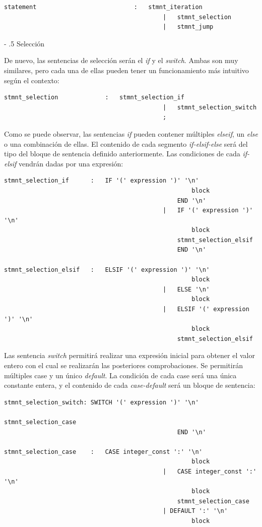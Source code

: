 \documentclass[a4paper,10pt]{article}
\makeatletter
\renewcommand\paragraph{%
   \@startsection{paragraph}{4}{0mm}%
      {-\baselineskip}%
      {.5\baselineskip}%
      {\normalfont\normalsize\bfseries}}
\makeatother
\begin{document}
\begin{lstlisting}
statement							:	stmnt_iteration
											|	stmnt_selection
											|	stmnt_jump
\end{lstlisting}
\paragraph{Selección}

De nuevo, las sentencias de selección serán el \textit{if} y el \textit{switch}. Ambas son muy similares, pero cada una de ellas pueden tener un funcionamiento más intuitivo según el contexto:
\begin{lstlisting}
stmnt_selection				:	stmnt_selection_if
											|	stmnt_selection_switch
											;
\end{lstlisting}

Como se puede observar, las sentencias \textit{if} pueden contener múltiples \textit{elseif}, un \textit{else} o una combinación de ellas. El contenido de cada segmento \textit{if-elsif-else} será del tipo del bloque de sentencia definido anteriormente. Las condiciones de cada \textit{if-elsif} vendrán dadas por una expresión:

\begin{lstlisting}
stmnt_selection_if		:	IF '(' expression ')' '\n' 
													block 
												END '\n'
											|	IF '(' expression ')' '\n' 
													block 
												stmnt_selection_elsif 
												END '\n'
									
stmnt_selection_elsif	:	ELSIF '(' expression ')' '\n' 
													block
											|	ELSE '\n' 
													block
											|	ELSIF '(' expression ')' '\n' 
													block 
												stmnt_selection_elsif
\end{lstlisting}

Las sentencia \textit{switch} permitirá realizar una expresión inicial para obtener el valor entero con el cual se realizarán las posteriores comprobaciones. Se permitirán múltiples case y un único \textit{default}. La condición de cada case será una única constante entera, y el contenido de cada \textit{case-default} será un bloque de sentencia:

\begin{lstlisting}
stmnt_selection_switch:	SWITCH '(' expression ')' '\n' 
													stmnt_selection_case 
												END '\n'
									
stmnt_selection_case	:	CASE integer_const ':' '\n' 
													block 
											|	CASE integer_const ':' '\n' 
													block 
												stmnt_selection_case
											| DEFAULT ':' '\n'
													block
\end{lstlisting}
\end{document}
